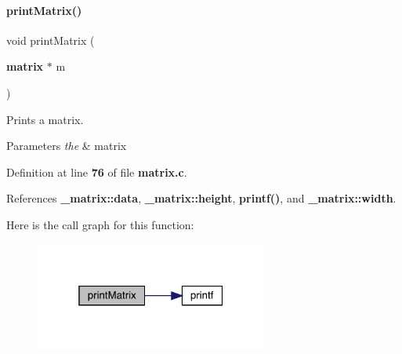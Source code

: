 \paragraph{print\+Matrix()}
{\footnotesize\ttfamily void print\+Matrix (\begin{DoxyParamCaption}\item[{\textbf{ matrix} $\ast$}]{m }\end{DoxyParamCaption})}



Prints a matrix. 


\begin{DoxyParams}{Parameters}
{\em the} & matrix \\
\hline
\end{DoxyParams}


Definition at line \textbf{ 76} of file \textbf{ matrix.\+c}.



References \textbf{ \+\_\+matrix\+::data}, \textbf{ \+\_\+matrix\+::height}, \textbf{ printf()}, and \textbf{ \+\_\+matrix\+::width}.


Here is the call graph for this function\+:
\nopagebreak
\begin{figure}[H]
\begin{center}
\leavevmode
\includegraphics[width=217pt]{matrix_8c_a50ab2b1ac33d6993d93522fc4f30a051_cgraph}
\end{center}
\end{figure}
\mbox{\label{matrix_8c_acdd57777a972ce339153878fa917db14}} 
